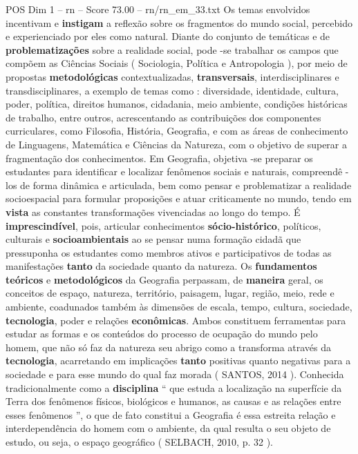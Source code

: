 \begin{textsample}{POS Dim 1 – rn – Score 73.00 – rn/rn\_em\_33.txt}
Os temas envolvidos incentivam e \textbf{instigam} a reflexão sobre os fragmentos do mundo social, percebido e experienciado por eles como natural.
Diante do conjunto de temáticas e de \textbf{problematizações} sobre a realidade social, pode -se trabalhar os campos que compõem as Ciências Sociais ( Sociologia, Política e Antropologia ), por meio de propostas \textbf{metodológicas} contextualizadas, \textbf{transversais}, interdisciplinares e transdisciplinares, a exemplo de temas como : diversidade, identidade, cultura, poder, política, direitos humanos, cidadania, meio ambiente, condições históricas de trabalho, entre outros, acrescentando as contribuições dos componentes curriculares, como Filosofia, História, Geografia, e com as áreas de conhecimento de Linguagens, Matemática e Ciências da Natureza, com o objetivo de superar a fragmentação dos conhecimentos.
Em Geografia, objetiva -se preparar os estudantes para identificar e localizar fenômenos sociais e naturais, compreendê -los de forma dinâmica e articulada, bem como pensar e problematizar a realidade socioespacial para formular proposições e atuar criticamente no mundo, tendo em \textbf{vista} as constantes transformações vivenciadas ao longo do tempo.
É \textbf{imprescindível}, pois, articular conhecimentos \textbf{sócio-histórico}, políticos, culturais e \textbf{socioambientais} ao se pensar numa formação cidadã que pressuponha os estudantes como membros ativos e participativos de todas as manifestações \textbf{tanto} da sociedade quanto da natureza.
Os \textbf{fundamentos} \textbf{teóricos} e \textbf{metodológicos} da Geografia perpassam, de \textbf{maneira} geral, os conceitos de espaço, natureza, território, paisagem, lugar, região, meio, rede e ambiente, coadunados também às dimensões de escala, tempo, cultura, sociedade, \textbf{tecnologia}, poder e relações \textbf{econômicas}.
Ambos constituem ferramentas para estudar as formas e os conteúdos do processo de ocupação do mundo pelo homem, que não só faz da natureza seu abrigo como a transforma através da \textbf{tecnologia}, acarretando em implicações \textbf{tanto} positivas quanto negativas para a sociedade e para esse mundo do qual faz morada ( SANTOS, 2014 ).
Conhecida tradicionalmente como a \textbf{disciplina} “ que estuda a localização na superfície da Terra dos fenômenos físicos, biológicos e humanos, as causas e as relações entre esses fenômenos ”, o que de fato constitui a Geografia é essa estreita relação e interdependência do homem com o ambiente, da qual resulta o seu objeto de estudo, ou seja, o espaço geográfico ( SELBACH, 2010, p. 32 ).

\end{textsample}
